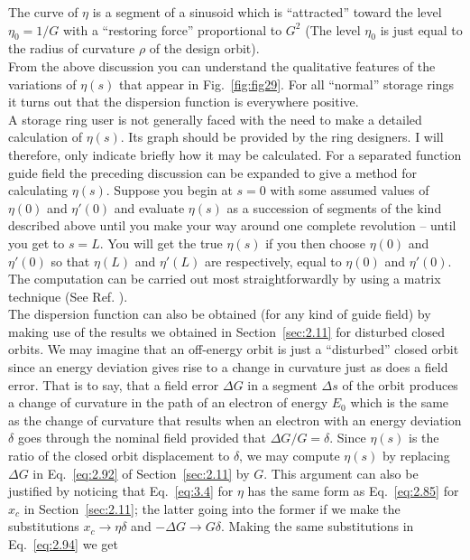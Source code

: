 The curve of $\eta$ is a segment of a sinusoid which is ``attracted'' toward the level
$\eta_0 = 1/G$ with a ``restoring force'' proportional to $G^2$ (The level $\eta_0$ is just equal
to the radius of curvature $\rho$ of the design orbit).\\
From the above discussion you can understand the qualitative features of the variations
 of $\eta(s)$ that appear in Fig.~\ref{fig:fig29}. For all ``normal'' storage rings it turns
out that the dispersion function is everywhere positive.\\
A storage ring user is not generally faced with the need to make a detailed calculation of $\eta(s)$. Its graph should be provided by the ring designers. I will therefore, only indicate briefly how it may be calculated. For a separated function guide field the preceding discussion can be expanded to give a method for calculating $\eta(s)$. Suppose you begin at $s = 0$ with some assumed values of $\eta(0)$ and $\eta'(0)$ and evaluate $\eta(s)$ as a succession of segments of the kind described above until you make your way around one complete revolution -- until you get to $s = L$. You will get the true $\eta(s)$ if you then choose $\eta(0)$ and $\eta'(0)$ so that $\eta(L)$ and $\eta'(L)$ are respectively, equal to $\eta(0)$ and $\eta'(0)$. The computation can be carried out most straightforwardly by using a matrix technique (See Ref. \cite{11}).\\
The dispersion function can also be obtained (for any kind of guide field) by making use of the results we obtained in Section~\ref{sec:2.11} for disturbed closed orbits. We may imagine that an off-energy orbit is just a ``disturbed'' closed orbit since an energy deviation gives rise to a change in curvature just as does a field error. That is to say, that a field error $\Delta G$ in a segment $\Delta s$ of the orbit produces a change of curvature in the path of an electron of energy $E_0$ which is the same as the change of curvature that results when an electron with an energy deviation $\delta$ goes through the nominal field provided that $\Delta G/G = \delta$. Since $\eta(s)$ is the ratio of the closed orbit displacement to $\delta$, we may compute $\eta(s)$ by replacing $\Delta G$ in Eq.~\eqref{eq:2.92} of Section~\ref{sec:2.11} by $G$. This argument can also be justified by noticing that Eq.~\eqref{eq:3.4} for $\eta$ has the same form as Eq.~\eqref{eq:2.85} for $x_c$ in Section~\ref{sec:2.11}; the latter going into the former if we make the substitutions $x_c \to \eta\delta$ and $-\Delta G \to G\delta$. Making the same substitutions in Eq.~\eqref{eq:2.94} we get
